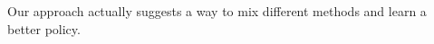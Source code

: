 Our approach actually suggests a way to mix different methods and learn a better policy.
\endinput









